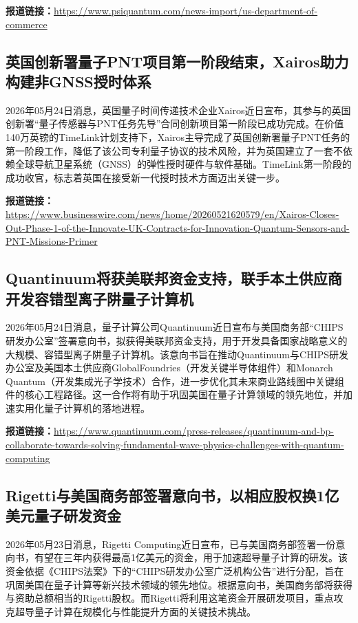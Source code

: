 \documentclass[12pt,a4paper]{ctexart}
\begin{document}
\noindent\textbf{报道链接：}\url{https://www.psiquantum.com/news-import/us-department-of-commerce}

\subsection{ 英国创新署量子PNT项目第一阶段结束，Xairos助力构建非GNSS授时体系 }

2026年05月24日消息，英国量子时间传递技术企业Xairos近日宣布，其参与的英国创新署“量子传感器与PNT任务先导”合同创新项目第一阶段已成功完成。在价值140万英镑的TimeLink计划支持下，Xairos主导完成了英国创新署量子PNT任务的第一阶段工作，降低了该公司专利量子协议的技术风险，并为英国建立了一套不依赖全球导航卫星系统（GNSS）的弹性授时硬件与软件基础。TimeLink第一阶段的成功收官，标志着英国在接受新一代授时技术方面迈出关键一步。

\noindent\textbf{报道链接：}\url{https://www.businesswire.com/news/home/20260521620579/en/Xairos-Closes-Out-Phase-1-of-the-Innovate-UK-Contracts-for-Innovation-Quantum-Sensors-and-PNT-Missions-Primer}

\subsection{ Quantinuum将获美联邦资金支持，联手本土供应商开发容错型离子阱量子计算机 }

2026年05月24日消息，量子计算公司Quantinuum近日宣布与美国商务部“CHIPS研发办公室”签署意向书，拟获得美联邦资金支持，用于开发具备国家战略意义的大规模、容错型离子阱量子计算机。该意向书旨在推动Quantinuum与CHIPS研发办公室及美国本土供应商GlobalFoundries（开发关键半导体组件）和Monarch Quantum（开发集成光子学技术）合作，进一步优化其未来商业路线图中关键组件的核心工程路径。这一合作将有助于巩固美国在量子计算领域的领先地位，并加速实用化量子计算机的落地进程。

\noindent\textbf{报道链接：}\url{https://www.quantinuum.com/press-releases/quantinuum-and-bp-collaborate-towards-solving-fundamental-wave-physics-challenges-with-quantum-computing}

\subsection{ Rigetti与美国商务部签署意向书，以相应股权换1亿美元量子研发资金 }

2026年05月23日消息，Rigetti Computing近日宣布，已与美国商务部签署一份意向书，有望在三年内获得最高1亿美元的资金，用于加速超导量子计算的研发。该资金依据《CHIPS法案》下的“CHIPS研发办公室广泛机构公告”进行分配，旨在巩固美国在量子计算等新兴技术领域的领先地位。根据意向书，美国商务部将获得与资助总额相当的Rigetti股权。而Rigetti将利用这笔资金开展研发项目，重点攻克超导量子计算在规模化与性能提升方面的关键技术挑战。
\end{document}
